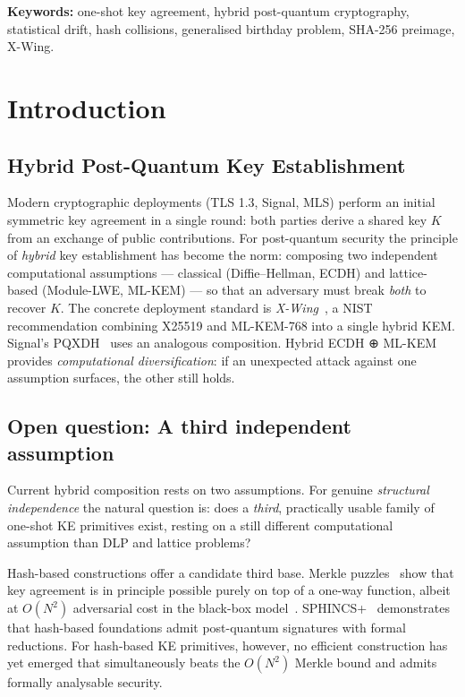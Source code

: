 \documentclass[11pt,a4paper]{article}
\begin{document}
\medskip
\textbf{Keywords:} one-shot key agreement, hybrid post-quantum cryptography, statistical drift, hash collisions, generalised birthday problem, SHA-256 preimage, X-Wing.

\section{Introduction}\label{sec:intro}

\subsection{Hybrid Post-Quantum Key Establishment}\label{sec:hybrid-pq}

Modern cryptographic deployments (TLS 1.3, Signal, MLS) perform an initial symmetric key agreement in a single round: both parties derive a shared key $K$ from an exchange of public contributions. For post-quantum security the principle of \emph{hybrid} key establishment has become the norm: composing two independent computational assumptions --- classical (Diffie--Hellman, ECDH) and lattice-based (Module-LWE, ML-KEM) --- so that an adversary must break \emph{both} to recover $K$. The concrete deployment standard is \emph{X-Wing}~\cite{xwing}, a NIST recommendation combining X25519 and ML-KEM-768 into a single hybrid KEM. Signal's PQXDH~\cite{PQXDH} uses an analogous composition. Hybrid ECDH ⊕ ML-KEM provides \emph{computational diversification}: if an unexpected attack against one assumption surfaces, the other still holds.

\subsection{Open question: A third independent assumption}\label{sec:third-assumption}

Current hybrid composition rests on two assumptions. For genuine \emph{structural independence} the natural question is: does a \emph{third}, practically usable family of one-shot KE primitives exist, resting on a still different computational assumption than DLP and lattice problems?

Hash-based constructions offer a candidate third base. Merkle puzzles~\cite{Merkle1978} show that key agreement is in principle possible purely on top of a one-way function, albeit at $O(N^2)$ adversarial cost in the black-box model~\cite{IR1989}. SPHINCS+~\cite{SPHINCS+} demonstrates that hash-based foundations admit post-quantum signatures with formal reductions. For hash-based KE primitives, however, no efficient construction has yet emerged that simultaneously beats the $O(N^2)$ Merkle bound and admits formally analysable security.
\end{document}
